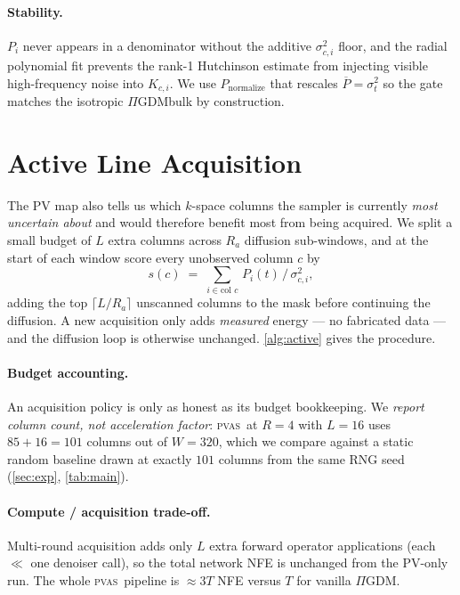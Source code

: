 \documentclass[conference]{IEEEtran}
\newcommand{\sigt}{\sigma_t}
\newcommand{\PIGDM}{$\Pi$GDM}
\newcommand{\PVAS}{\textsc{pvas}}
\begin{document}
\paragraph{Stability.} $P_i$ never appears in a denominator without
the additive $\sigma_{c,i}^{2}$ floor, and the radial polynomial fit
prevents the rank-1 Hutchinson estimate from injecting visible
high-frequency noise into $K_{c,i}$. We use $P_{\text{normalize}}$
that rescales $\overline{P}{=}\sigt^{2}$ so the gate matches the
isotropic \PIGDM bulk by construction.

\section{Active Line Acquisition}\label{sec:active}

The PV map also tells us which $k$-space columns the sampler is
currently \emph{most uncertain about} and would therefore benefit
most from being acquired. We split a small budget of $L$ extra columns
across $R_a$ diffusion sub-windows, and at the start of each window
score every unobserved column $c$ by
\begin{equation}
  s(c) \;=\; \sum_{i \in \text{col } c}\, P_i(t) \,/\, \sigma_{c,i}^{2},
  \label{eq:scorefn}
\end{equation}
adding the top $\lceil L/R_a \rceil$ unscanned columns to the mask
before continuing the diffusion. A new acquisition only adds
\emph{measured} energy --- no fabricated data --- and the diffusion
loop is otherwise unchanged. \cref{alg:active} gives the procedure.

\paragraph{Budget accounting.} An acquisition policy is only as
honest as its budget bookkeeping. We \emph{report column count, not
acceleration factor}: \PVAS\ at $R{=}4$ with $L{=}16$ uses $85{+}16
{=}101$ columns out of $W{=}320$, which we compare against a static
random baseline drawn at exactly $101$ columns from the same RNG
seed (\cref{sec:exp}, \cref{tab:main}).

\paragraph{Compute / acquisition trade-off.} Multi-round acquisition
adds only $L$ extra forward operator applications (each $\ll$ one
denoiser call), so the total network NFE is unchanged from the
PV-only run. The whole \PVAS\ pipeline is $\approx 3 T$ NFE versus
$T$ for vanilla \PIGDM.
\end{document}
